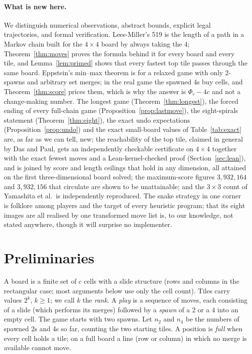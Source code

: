 \documentclass[11pt]{article}
\theoremstyle{definition}
\theoremstyle{remark}
\newcommand{\nfour}{n_4}
\newcommand{\ntwo}{n_2}
\begin{document}
\paragraph{What is new here.} We distinguish numerical observations,
abstract bounds, explicit legal trajectories, and formal verification. Lees-Miller's 519 is the
length of a path in a Markov chain built for the $4\times4$ board by always
taking the 4; Theorem~\ref{thm:moves} proves the formula behind it for
every board and every tile, and Lemma~\ref{lem:primed} shows that every
fastest top tile passes through the same board. Eppstein's min--max
theorem is for a relaxed game with only 2-spawns and arbitrary set merges;
in the real game the spawned 4s buy cells, and Theorem~\ref{thm:score}
prices them, which is why the answer is $\Phi_c-4c$ and not a
change-making number. The longest game (Theorem~\ref{thm:longest}), the
forced ending of every full-chain game (Proposition~\ref{prop:lastmove}),
the eight-spirals statement (Theorem~\ref{thm:eight}), the exact undo
expectations (Proposition~\ref{prop:undo}) and the exact small-board
values of Table~\ref{tab:exact} are, as far as we can tell, new; the reachability of the top tile, claimed in general by Das and Paul,
gets an independently checkable certificate on $4\times4$ together with
the exact fewest moves and a Lean-kernel-checked proof
(Section~\ref{sec:lean}), and is joined by score and length ceilings that
hold in any dimension, all attained on the first three-dimensional board
solved; the
maximum-score figures $3{,}932{,}164$ and $3{,}932{,}156$ that circulate
are shown to be unattainable; and the $3\times3$ count of Yamashita et
al.\ is independently reproduced. The snake strategy in one corner is
folklore among players and the target of every heuristic program; that its
eight images are all realised by one transformed move list is, to our
knowledge, not stated anywhere, though it will surprise no implementer.

\section{Preliminaries}

A board is a finite set of $c$ cells with a slide structure (rows and
columns in the rectangular case; most arguments below use only the cell
count). Tiles carry values $2^k$, $k\ge1$; we call $k$ the \emph{rank}. A
\emph{play} is a sequence of moves, each consisting of a slide (which
performs its merges) followed by a \emph{spawn} of a 2 or a 4 into an empty
cell. The game starts with two spawns. Let $\ntwo$ and $\nfour$ be the
numbers of spawned 2s and 4s so far, counting the two starting tiles. A
position is \emph{full} when every cell holds a tile; on a full board a
line (row or column) in which no merge is available cannot move.
\end{document}
